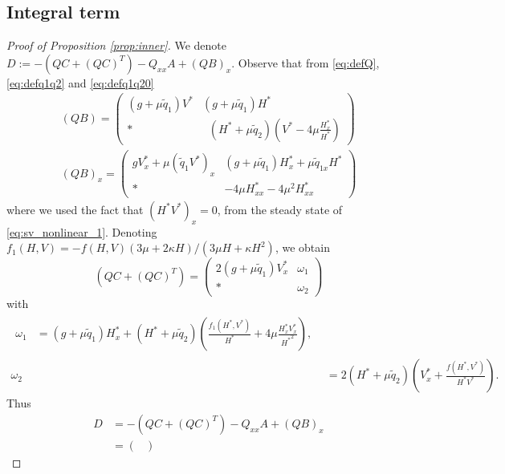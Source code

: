 \documentclass[11pt]{article}
\begin{document}
\subsection{Integral term}
\label{ssec:int}
\begin{proof}[Proof of Proposition \ref{prop:inner}]
We denote $D := - (QC+(QC)^{T}) - Q_{xx}A + (QB)_x$. 
{
Observe that from \eqref{eq:defQ}, \eqref{eq:defq1q2} and \eqref{eq:defq1q20}
\begin{gather}
(Q B) = \begin{pmatrix}
 (g+\mu \tilde{q}_{1}) V^{*} & (g+\mu \tilde{q}_{1}) H^{*}\\
 \ast 
 \;\; &\;\; (H^{*}+\mu \tilde{q}_{2})(V^{*}-4\mu \frac{H^{*}_{x}}{H^{*}})
\end{pmatrix}\\
    (QB)_{x} = \begin{pmatrix}
        g{V^{*}_{x}} +\mu (\tilde{q}_{1}{V^{*}})_x &  (g+\mu \tilde{q}_{1}){H^{*}_{x}}+\mu\tilde{q}_{1x}{H^{*}}\\
        \ast & -4\mu {H^{*}_{xx}}-4\mu^{2}{{H^{*}_{xx}}}
    \end{pmatrix}
\end{gather}
{where we used the fact that $(H^{*}V^{*})_x = 0$, from the steady state of \eqref{eq:sv_nonlinear_1}.
}
Denoting $f_{1}(H,V) = -f(H,V)(3\mu+2\kappa H)/(3\mu H+\kappa H^{2})$, we obtain
 \begin{equation}
  (QC+(QC)^{T}) = \begin{pmatrix}
      2(g+\mu \tilde{q}_{1}){V^{*}_{x}} & \omega_1 \\
      \ast & \omega_2
  \end{pmatrix}  
\end{equation} 
with
\begin{align}
\begin{split}
    \omega_1 &= (g+\mu \tilde{q}_{1}){H^{*}_{x}}+({H^{*}}+\mu \tilde{q}_{2}) \left( {\frac{f_{1}({H^{*}},{V^{*}})}{H^*}}+4\mu \frac{{H^{*}_{x}}{V^{*}_{x}}}{{H^{*}}^{2}}\right),
\end{split}\\
    \omega_2 &= 2({H^{*}}+\mu \tilde{q}_{2})\left({V^{*}_{x}}+\frac{f({H^{*}},{V^{*}})}{{H^*}{V^{*}}}\right).
\end{align}
Thus
 \begin{equation}
\begin{split}
\label{eq:expressionD}
    D &= { - } (QC+(QC)^{T}) - Q_{xx}A + (QB)_x\\
    &=\begin{pmatrix}

\end{pmatrix}
\end{split}
\end{equation}}
\end{proof}
\end{document}
